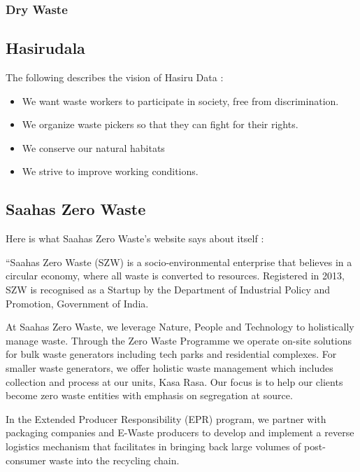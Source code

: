\documentclass[10pt]{article}
\begin{document}
\subsubsection{Dry Waste}

\subsection{Hasirudala}

The following describes the vision of Hasiru Data \citep{HasiruDala:home}:

\begin{itemize}
	\item We want waste workers to participate in society, free from discrimination.
	\item We organize waste pickers so that they can fight for their rights.
	\item We conserve our natural habitats
	\item We strive to improve working conditions.
\end{itemize}

\subsection{Saahas Zero Waste}

Here is what Saahas Zero Waste's website says about itself \citep{SaahasZeroWaste:about}:

``Saahas Zero Waste (SZW) is a socio-environmental enterprise that believes in a circular economy, where all waste is converted to resources. Registered in 2013, SZW is recognised as a Startup by the Department of Industrial Policy and Promotion, Government of India.

At Saahas Zero Waste, we leverage Nature, People and Technology to holistically manage waste. Through the Zero Waste Programme we operate on-site solutions for bulk waste generators including tech parks and residential complexes. For smaller waste generators, we offer holistic waste management which includes collection and process at our units, Kasa Rasa. Our focus is to help our clients become zero waste entities with emphasis on segregation at source.

In the Extended Producer Responsibility (EPR) program, we partner with packaging companies and E-Waste producers to develop and implement a reverse logistics mechanism that facilitates in bringing back large volumes of post-consumer waste into the recycling chain.
\end{document}
